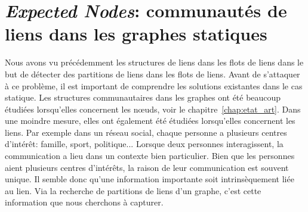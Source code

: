 \chapter{\emph{Expected Nodes}: communautés de liens dans les graphes statiques}
\minitoc

\label{chap:Expected_Node}
Nous avons vu précédemment les structures de liens dans les flots de liens dans le but de détecter des partitions de liens dans les flots de liens.
Avant de s'attaquer à ce problème, il est important de comprendre les solutions existantes dans le cas statique.
Les structures communautaires dans les graphes ont été beaucoup étudiées lorsqu'elles concernent les n\oe uds, voir le chapitre~\ref{chap:etat_art}.
Dans une moindre mesure, elles ont également été étudiées lorsqu'elles concernent les liens.
Par exemple dans un réseau social, chaque personne a plusieurs centres d'intérêt: famille, sport, politique...
Lorsque deux personnes interagissent, la communication a lieu dans un contexte bien particulier.
Bien que les personnes aient plusieurs centres d'intérêts, la raison de leur communication est souvent unique.
Il semble donc qu'une information importante soit intrinsèquement liée au lien.
Via la recherche de partitions de liens d'un graphe, c'est cette information que nous cherchons à capturer.

